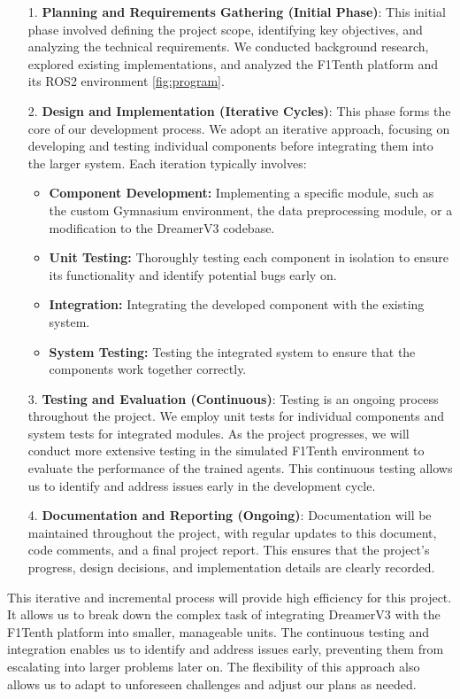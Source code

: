 \begin{itemize}
    \item[1.] \textbf{Planning and Requirements Gathering (Initial Phase)}:  This initial phase involved defining the project scope, identifying key objectives, and analyzing the technical requirements.  We conducted background research, explored existing implementations, and analyzed the F1Tenth platform and its ROS2 environment \ref{fig:program}.

    \item[2.] \textbf{Design and Implementation (Iterative Cycles)}: This phase forms the core of our development process.  We adopt an iterative approach, focusing on developing and testing individual components before integrating them into the larger system.  Each iteration typically involves:
    \begin{itemize}
        \item \textbf{Component Development:} Implementing a specific module, such as the custom Gymnasium environment, the data preprocessing module, or a modification to the DreamerV3 codebase.
        \item \textbf{Unit Testing:} Thoroughly testing each component in isolation to ensure its functionality and identify potential bugs early on.
        \item \textbf{Integration:} Integrating the developed component with the existing system.
        \item \textbf{System Testing:} Testing the integrated system to ensure that the components work together correctly.
    \end{itemize}
    
    \item[3.] \textbf{Testing and Evaluation (Continuous)}: Testing is an ongoing process throughout the project.  We employ unit tests for individual components and system tests for integrated modules.  As the project progresses, we will conduct more extensive testing in the simulated F1Tenth environment to evaluate the performance of the trained agents.  This continuous testing allows us to identify and address issues early in the development cycle.
    
    \item[4.] \textbf{Documentation and Reporting (Ongoing)}: Documentation will be maintained throughout the project, with regular updates to this document, code comments, and a final project report.  This ensures that the project's progress, design decisions, and implementation details are clearly recorded.
\end{itemize}
This iterative and incremental process will provide high efficiency for this project.  It allows us to break down the complex task of integrating DreamerV3 with the F1Tenth platform into smaller, manageable units.  The continuous testing and integration enables us to identify and address issues early, preventing them from escalating into larger problems later on.  The flexibility of this approach also allows us to adapt to unforeseen challenges and adjust our plans as needed.
